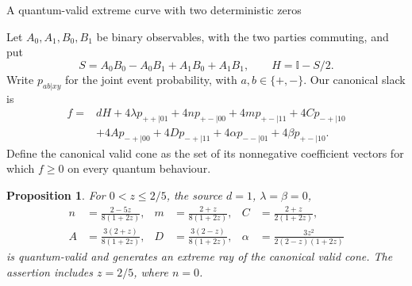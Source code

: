 \documentclass[11pt]{article}
\newtheorem{proposition}{Proposition}
\newcommand{\Id}{\mathbb I}
\begin{document}
\begin{center}\large A quantum-valid extreme curve with two deterministic zeros\end{center}

Let $A_0,A_1,B_0,B_1$ be binary observables, with the two parties
commuting, and put
\[
 S=A_0B_0-A_0B_1+A_1B_0+A_1B_1,\qquad H=\Id-S/2.
\]
Write $p_{ab|xy}$ for the joint event probability, with $a,b\in\{+,-\}$.
Our canonical slack is
\begin{align*}
 f={}&dH+4\lambda p_{++|01}+4n p_{+-|00}+4m p_{+-|11}
       +4C p_{-+|10}\\
    &+4A p_{-+|00}+4D p_{-+|11}
       +4\alpha p_{--|01}+4\beta p_{+-|10}.
\end{align*}
Define the canonical valid cone as the set of its nonnegative coefficient
vectors for which $f\geq0$ on every quantum behaviour.

\begin{proposition}
For $0<z\leq2/5$, the source $d=1$, $\lambda=\beta=0$,
\begin{align*}
 n&=\frac{2-5z}{8(1+2z)},&
 m&=\frac{2+z}{8(1+2z)},&
 C&=\frac{2+z}{2(1+2z)},\\
 A&=\frac{3(2+z)}{8(1+2z)},&
 D&=\frac{3(2-z)}{8(1+2z)},&
 \alpha&=\frac{3z^2}{2(2-z)(1+2z)}
\end{align*}
is quantum-valid and generates an extreme ray of the canonical valid cone.
The assertion includes $z=2/5$, where $n=0$.
\end{proposition}
\end{document}
